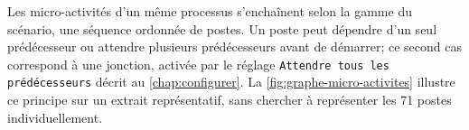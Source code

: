 Les micro-activités d'un même processus s'enchaînent selon la gamme du scénario, une séquence ordonnée de postes. Un poste peut dépendre d'un seul prédécesseur ou attendre plusieurs prédécesseurs avant de démarrer; ce second cas correspond à une jonction, activée par le réglage \texttt{Attendre tous les prédécesseurs} décrit au \cref{chap:configurer}. La \cref{fig:graphe-micro-activites} illustre ce principe sur un extrait représentatif, sans chercher à représenter les 71 postes individuellement.


